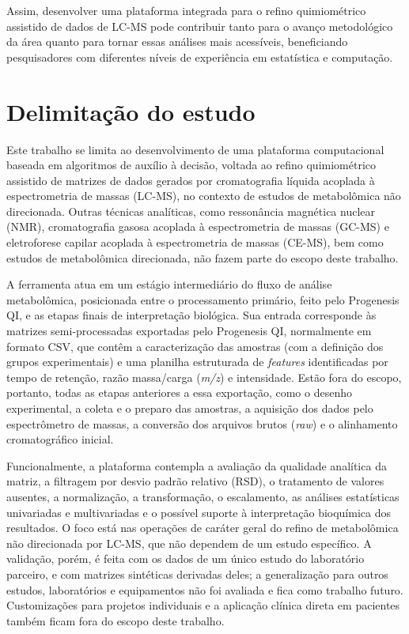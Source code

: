 Assim, desenvolver uma plataforma integrada para o refino quimiométrico assistido de dados de LC-MS pode contribuir tanto para o avanço metodológico da área quanto para tornar essas análises mais acessíveis, beneficiando pesquisadores com diferentes níveis de experiência em estatística e computação.

\section{Delimitação do estudo}

Este trabalho se limita ao desenvolvimento de uma plataforma computacional baseada em algoritmos de auxílio à decisão, voltada ao refino quimiométrico assistido de matrizes de dados gerados por cromatografia líquida acoplada à espectrometria de massas (LC-MS), no contexto de estudos de metabolômica não direcionada. Outras técnicas analíticas, como ressonância magnética nuclear (NMR), cromatografia gasosa acoplada à espectrometria de massas (GC-MS) e eletroforese capilar acoplada à espectrometria de massas (CE-MS), bem como estudos de metabolômica direcionada, não fazem parte do escopo deste trabalho.

A ferramenta atua em um estágio intermediário do fluxo de análise metabolômica, posicionada entre o processamento primário, feito pelo Progenesis QI, e as etapas finais de interpretação biológica. Sua entrada corresponde às matrizes semi-processadas exportadas pelo Progenesis QI, normalmente em formato CSV, que contêm a caracterização das amostras (com a definição dos grupos experimentais) e uma planilha estruturada de \textit{features} identificadas por tempo de retenção, razão massa/carga (\textit{m/z}) e intensidade. Estão fora do escopo, portanto, todas as etapas anteriores a essa exportação, como o desenho experimental, a coleta e o preparo das amostras, a aquisição dos dados pelo espectrômetro de massas, a conversão dos arquivos brutos (\textit{raw}) e o alinhamento cromatográfico inicial.

Funcionalmente, a plataforma contempla a avaliação da qualidade analítica da matriz, a filtragem por desvio padrão relativo (RSD), o tratamento de valores ausentes, a normalização, a transformação, o escalamento, as análises estatísticas univariadas e multivariadas e o possível suporte à interpretação bioquímica dos resultados. O foco está nas operações de caráter geral do refino de metabolômica não direcionada por LC-MS, que não dependem de um estudo específico. A validação, porém, é feita com os dados de um único estudo do laboratório parceiro, e com matrizes sintéticas derivadas deles; a generalização para outros estudos, laboratórios e equipamentos não foi avaliada e fica como trabalho futuro. Customizações para projetos individuais e a aplicação clínica direta em pacientes também ficam fora do escopo deste trabalho.